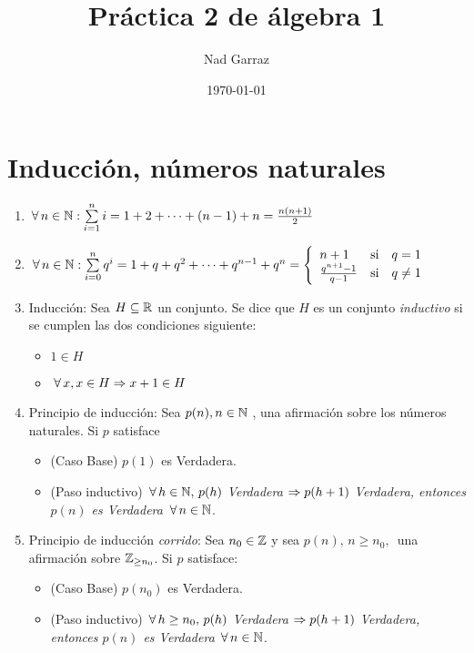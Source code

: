 \documentclass[12pt,a4paper, spanish]{article}
\begin{document}
\pagestyle{empty} %

\title{Práctica 2 de álgebra 1} %
\author{Nad Garraz} %
\date{\today} %

\section*{Inducción, números naturales}

\begin{enumerate}
	\item $\paratodo n \en \naturales: \sumatoria{i = 1}{n} i =  1 + 2 + \cdots + (n-1) + n = \frac{n(n+1)}{2}$

	\item $\paratodo n \en \naturales: \sumatoria{i = 0}{n} q^i =
		      1 + q + q^2 + \cdots  + q^{n-1} + q^n =
		      \llave{lll}{
			      n+1 & \text{si} & q = 1\\
			      \frac{q^{n+1}-1}{q-1} & \text{si} & q \distinto 1\\
		      }$

	\item Inducción: Sea $H \subseteq \reales$ un conjunto. Se dice que $H$ es un conjunto \textit{inductivo} si se cumplen las dos condiciones siguiente:
	      \begin{itemize}
		      \item $1 \in H$
		      \item $\paratodo x , x \in H \entonces x+1 \en H$
	      \end{itemize}

	\item Principio de inducción: Sea $p(n), n \in \naturales$ , una afirmación sobre los números naturales.
	      Si $p$ satisface
	      \begin{itemize}
		      \item (Caso Base) $p(1)$ es Verdadera.
		      \item (Paso inductivo) $\paratodo h \en \naturales,\, p(h)$ \textit{Verdadera}
		            $\entonces p(h+1)$ \textit{Verdadera, entonces $p(n)$ es Verdadera} $\paratodo n \en \naturales$.
	      \end{itemize}

	\item Principio de inducción \textit{corrido}: Sea $n_0 \en \enteros$ y sea $p(n),\, n\geq n_0,\,$ una afirmación sobre $\enteros_{\geq n_0}$. Si $p$
	      satisface:
	      \begin{itemize}
		      \item (Caso Base) $p(n_0)$ es Verdadera.
		      \item (Paso inductivo) $\paratodo h \geq n_0,\, p(h)$ \textit{Verdadera}
		            $\entonces p(h+1)$ \textit{Verdadera, entonces $p(n)$ es Verdadera} $\paratodo n \en \naturales$.
	      \end{itemize}
\end{enumerate}
\end{document}
